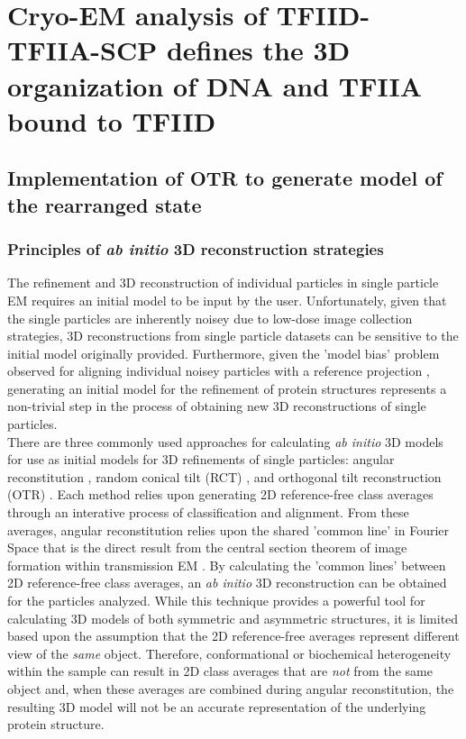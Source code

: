 \chapter{Cryo-EM analysis of TFIID-TFIIA-SCP defines the 3D organization of DNA and TFIIA bound to TFIID}

\section{Implementation of OTR to generate model of the rearranged state}

\subsection{Principles of \emph{ab initio} 3D reconstruction strategies}

The refinement and 3D reconstruction of individual particles in single particle EM requires an initial model to be input by the user. Unfortunately, given that the single particles are inherently noisey due to low-dose image collection strategies, 3D reconstructions from single particle datasets can be sensitive to the initial model originally provided. Furthermore, given the 'model bias' problem observed for aligning individual noisey particles with a reference projection \cite{Stewart_2004}, generating an initial model for the refinement of protein structures represents a non-trivial step in the process of obtaining new 3D reconstructions of single particles. \\
\indent There are three commonly used approaches for calculating \emph{ab initio} 3D models for use as initial models for 3D refinements of single particles: angular reconstitution \cite{VanHeel_1987}, random conical tilt (RCT) \cite{Radermacher_1987}, and orthogonal tilt reconstruction (OTR) \cite{Leschziner_1228}. Each method relies upon generating 2D reference-free class averages through an interative process of classification and alignment. From these averages, angular reconstitution relies upon the shared 'common line' in Fourier Space that is the direct result from the central section theorem of image formation within transmission EM \cite{DeRosier_1968}. By calculating the 'common lines' between 2D reference-free class averages, an \emph{ab initio} 3D reconstruction can be obtained for the particles analyzed. While this technique provides a powerful tool for calculating 3D models of both symmetric and asymmetric structures, it is limited based upon the assumption that the 2D reference-free averages represent different view of the \emph{same} object. Therefore, conformational or biochemical heterogeneity within the sample can result in 2D class averages that are \emph{not} from the same object and, when these averages are combined during angular reconstitution, the resulting 3D model will not be an accurate representation of the underlying protein structure.\\
